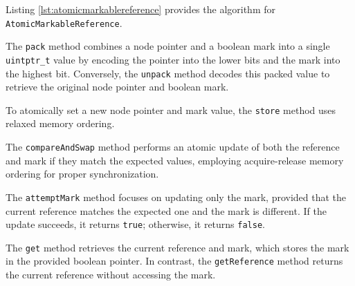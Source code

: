 Listing \ref{lst:atomicmarkablereference} provides the algorithm for \texttt{AtomicMarkableReference}.

The \texttt{pack} method combines a node pointer and a boolean mark into a single \texttt{uintptr\_t} value by encoding the pointer into the lower bits and the mark into the highest bit. Conversely, the \texttt{unpack} method decodes this packed value to retrieve the original node pointer and boolean mark.

To atomically set a new node pointer and mark value, the \texttt{store} method uses relaxed memory ordering.

The \texttt{compareAndSwap} method performs an atomic update of both the reference and mark if they match the expected values, employing acquire-release memory ordering for proper synchronization.

The \texttt{attemptMark} method focuses on updating only the mark, provided that the current reference matches the expected one and the mark is different. If the update succeeds, it returns \texttt{true}; otherwise, it returns \texttt{false}.

The \texttt{get} method retrieves the current reference and mark, which stores the mark in the provided boolean pointer. In contrast, the \texttt{getReference} method returns the current reference without accessing the mark.

\begin{figure}[!p]
    \centering
    
\end{figure}